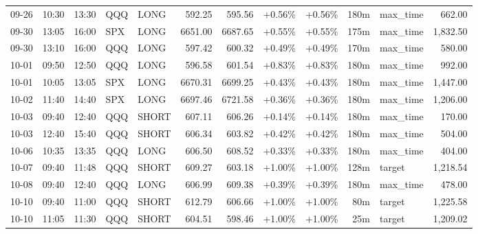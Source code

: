\documentclass[11pt,a4paper,twoside]{article}
\begin{document}
\begin{center}
\begin{longtable}{>{\color{txtmain}}l l l l l r r r r r >{\color{txtmain}}l r}
09-26 & 10:30 & 13:30 & QQQ & LONG & 592.25 & 595.56 & \textcolor{wingreen}{+0.56\%} & \textcolor{wingreen}{+0.56\%} & 180m & max\_time & \textcolor{wingreen}{662.00} \\
09-30 & 13:05 & 16:00 & SPX & LONG & 6651.00 & 6687.65 & \textcolor{wingreen}{+0.55\%} & \textcolor{wingreen}{+0.55\%} & 175m & max\_time & \textcolor{wingreen}{1,832.50} \\
09-30 & 13:10 & 16:00 & QQQ & LONG & 597.42 & 600.32 & \textcolor{wingreen}{+0.49\%} & \textcolor{wingreen}{+0.49\%} & 170m & max\_time & \textcolor{wingreen}{580.00} \\
10-01 & 09:50 & 12:50 & QQQ & LONG & 596.58 & 601.54 & \textcolor{wingreen}{+0.83\%} & \textcolor{wingreen}{+0.83\%} & 180m & max\_time & \textcolor{wingreen}{992.00} \\
10-01 & 10:05 & 13:05 & SPX & LONG & 6670.31 & 6699.25 & \textcolor{wingreen}{+0.43\%} & \textcolor{wingreen}{+0.43\%} & 180m & max\_time & \textcolor{wingreen}{1,447.00} \\
10-02 & 11:40 & 14:40 & SPX & LONG & 6697.46 & 6721.58 & \textcolor{wingreen}{+0.36\%} & \textcolor{wingreen}{+0.36\%} & 180m & max\_time & \textcolor{wingreen}{1,206.00} \\
10-03 & 09:40 & 12:40 & QQQ & SHORT & 607.11 & 606.26 & \textcolor{wingreen}{+0.14\%} & \textcolor{wingreen}{+0.14\%} & 180m & max\_time & \textcolor{wingreen}{170.00} \\
10-03 & 12:40 & 15:40 & QQQ & SHORT & 606.34 & 603.82 & \textcolor{wingreen}{+0.42\%} & \textcolor{wingreen}{+0.42\%} & 180m & max\_time & \textcolor{wingreen}{504.00} \\
10-06 & 10:35 & 13:35 & QQQ & LONG & 606.50 & 608.52 & \textcolor{wingreen}{+0.33\%} & \textcolor{wingreen}{+0.33\%} & 180m & max\_time & \textcolor{wingreen}{404.00} \\
10-07 & 09:40 & 11:48 & QQQ & SHORT & 609.27 & 603.18 & \textcolor{wingreen}{+1.00\%} & \textcolor{wingreen}{+1.00\%} & 128m & target & \textcolor{wingreen}{1,218.54} \\
10-08 & 09:40 & 12:40 & QQQ & LONG & 606.99 & 609.38 & \textcolor{wingreen}{+0.39\%} & \textcolor{wingreen}{+0.39\%} & 180m & max\_time & \textcolor{wingreen}{478.00} \\
10-10 & 09:40 & 11:00 & QQQ & SHORT & 612.79 & 606.66 & \textcolor{wingreen}{+1.00\%} & \textcolor{wingreen}{+1.00\%} & 80m & target & \textcolor{wingreen}{1,225.58} \\
10-10 & 11:05 & 11:30 & QQQ & SHORT & 604.51 & 598.46 & \textcolor{wingreen}{+1.00\%} & \textcolor{wingreen}{+1.00\%} & 25m & target & \textcolor{wingreen}{1,209.02} \\

\end{longtable}
\end{center}
\end{document}
